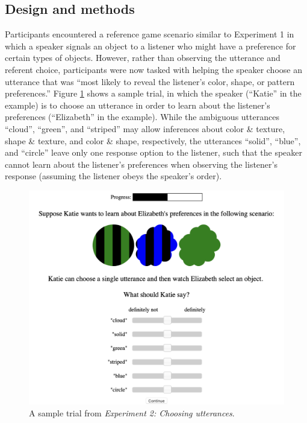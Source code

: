 \documentclass[11pt,a4paper]{article}
\begin{document}
\subsection{Design and methods}

Participants encountered a reference game scenario similar to Experiment 1 in which a speaker signals an object to a listener who might have a preference for certain types of objects. However, rather than observing the utterance and referent choice, participants were now tasked with helping the speaker choose an utterance that was ``most likely to reveal the listener's color, shape, or pattern preferences.'' Figure \ref{exp2-trial} shows a sample trial, in which the speaker (``Katie'' in the example) is to choose an utterance in order to learn about the listener's preferences (``Elizabeth'' in the example). While the ambiguous utterances ``cloud'', ``green'', and ``striped'' may allow inferences about color \& texture, shape \& texture, and color \& shape, respectively, the utterances ``solid'', ``blue'', and ``circle'' leave only one response option to the listener, such that the speaker cannot learn about the listener's preferences when observing the listener's response (assuming the listener obeys the speaker's order).  


\begin{figure}[ht]
	\centering
	\includegraphics[width=4.5in]{images/utterance-choice-trial.png}
	\caption{A sample trial from \emph{Experiment 2: Choosing utterances}. }\label{exp2-trial}
\end{figure} 
\end{document}
